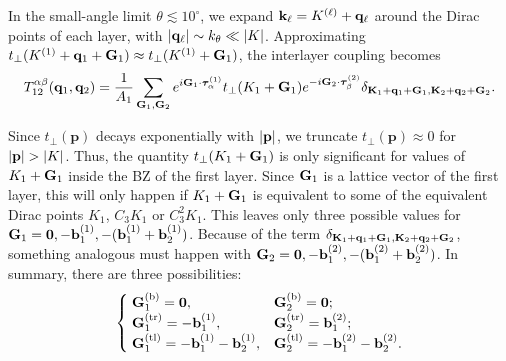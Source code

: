 In the small-angle limit \( \theta \lesssim 10^\circ \), we expand \( \mathbf{k}_\ell = K^{(\ell)}+ {\vb{q}}_\ell \) around the Dirac points of each layer, with \( \abs{{\vb{q}}_\ell} \sim k_\theta \ll \abs{K} \). Approximating \( t_\perp(K^{(1)}+ {\vb{q}}_1 + {\vb{G}}_1) \approx t_\perp(K^{(1)} + {\vb{G}}_1) \), the interlayer coupling becomes
\begin{equation} \label{eq:interlayer-hopping-truncation}
T_{12}^{\alpha\beta}({\vb{q}}_1, {\vb{q}}_2) = \frac{1}{A_{1}} \sum_{{\vb{G}}_1, {\vb{G}}_2} e^{i {\vb{G}}_1 \cdot \bm{\tau}_{\alpha}^{(1)}}
t_{\perp}(K_1 + {\vb{G}}_1) e^{-i {\vb{G}}_2 \cdot \bm{\tau}_{\beta}^{(2)}}
\delta_{{\vb{K}}_1 + {\vb{q}}_1 + {\vb{G}}_1, {\vb{K}}_2 + {\vb{q}}_2 + {\vb{G}}_2}.
\end{equation}

Since \( t_\perp(\mathbf{p}) \) decays exponentially with \( \abs{\mathbf{p}} \), we truncate \( t_\perp(\mathbf{p}) \approx 0 \) for \( \abs{\mathbf{p}} > \abs{K} \). Thus, the quantity $t_\perp(K_1 + {\vb{G}}_1)$ is only significant for values of $K_1 + {\vb{G}}_1$ inside the BZ of the first layer. Since ${\vb{G}}_1$ is a lattice vector of the first layer, this will only happen if $K_1 + {\vb{G}}_1$ is equivalent to some of the equivalent Dirac points $K_1$, $C_{3} K_1$ or $C_{3}^2 K_1$. This leaves only three possible values for ${\vb{G}}_1 = {\vb{0}}, -{\vb{b}}_1^{(1)}, -({\vb{b}}_1^{(1)}+{\vb{b}}_2^{(1)})$. Because of the term $\delta_{{\vb{K}}_1 + {\vb{q}}_1 + {\vb{G}}_1, {\vb{K}}_2 + {\vb{q}}_2 + {\vb{G}}_2}$, something analogous must happen with ${\vb{G}}_2 = {\vb{0}}, -{\vb{b}}_1^{(2)}, -({\vb{b}}_1^{(2)}+{\vb{b}}_2^{(2)})$. In summary, there are three possibilities:
\begin{align} \label{eq:G1G2_3_possibilities}
\begin{cases}
\; {\vb{G}}_1^{(\text{b})} = {\vb{0}},                      & {\vb{G}}_2^{(\text{b})} = {\vb{0}}; \\
\; {\vb{G}}_1^{(\text{tr})} = -{\vb{b}}_1^{(1)},            & {\vb{G}}_2^{(\text{tr})} = {\vb{b}}_1^{(2)}; \\
\; {\vb{G}}_1^{(\text{tl})} = -{\vb{b}}_1^{(1)}-{\vb{b}}_2^{(1)}, & {\vb{G}}_2^{(\text{tl})} = -{\vb{b}}_1^{(2)}-{\vb{b}}_2^{(2)}.
\end{cases}
\end{align}

